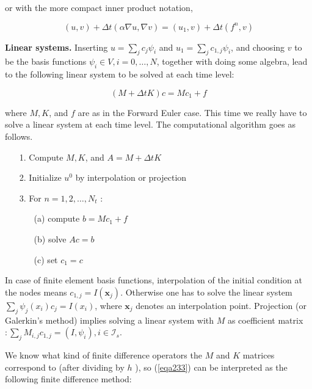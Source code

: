 \documentclass[../main.tex]{subfiles}
\begin{document}
		\noindent or with the more compact inner product notation,
	
		\begin{equation}
			\label{eqa232}	
		(u, v)+\Delta t(\alpha \nabla u, \nabla v)=\left(u_{1}, v\right)+\Delta t\left(f^{n}, v\right)
		\end{equation}
	
		\noindent \textbf{Linear systems.   } Inserting $u=\sum_{j} c_{j} \psi_{i}$ and $u_{1}=\sum_{j} c_{1, j} \psi_{i}$, and choosing $v$ to be the basis functions $\psi_{i} \in V, i=0, \ldots, N$, together with doing some algebra, lead to the following linear system to be solved at each time level:
		
		\begin{equation}
			\label{eqa233}	
			(M+\Delta t K) c=M c_{1}+f
		\end{equation}
	
		\noindent where $M, K$, and $f$ are as in the Forward Euler case. This time we really have to solve a linear system at each time level. The computational algorithm goes as follows.
		
		\begin{itemize}
			\item[1.] Compute $M, K$, and $A=M+\Delta t K$
			\item[2.] Initialize $u^{0}$ by interpolation or projection
			\item[3.] For $n=1,2, \ldots, N_{t}$ :
			\begin{itemize}
				\item[(a)] compute $b=M c_{1}+f$
				\item[(b)] solve $A c=b$
				\item[(c)] set $c_{1}=c$
			\end{itemize}
		\end{itemize}
		
		\noindent In case of finite element basis functions, interpolation of the initial condition at the nodes means $c_{1, j}=I\left(\boldsymbol{x}_{j}\right)$. Otherwise one has to solve the linear system $\sum_{j} \psi_{j}\left(x_{i}\right) c_{j}=I\left(x_{i}\right)$, where $\boldsymbol{x}_{j}$ denotes an interpolation point. Projection (or Galerkin's method) implies solving a linear system with $M$ as coefficient matrix $: \sum_{j} M_{i, j} c_{1, j}=\left(I, \psi_{i}\right), i \in \mathcal{I}_{s}$.
		
		We know what kind of finite difference operators the $M$ and $K$ matrices correspond to (after dividing by $h$ ), so (\ref{eqa233}) can be interpreted as the following finite difference method:
		
\end{document}
